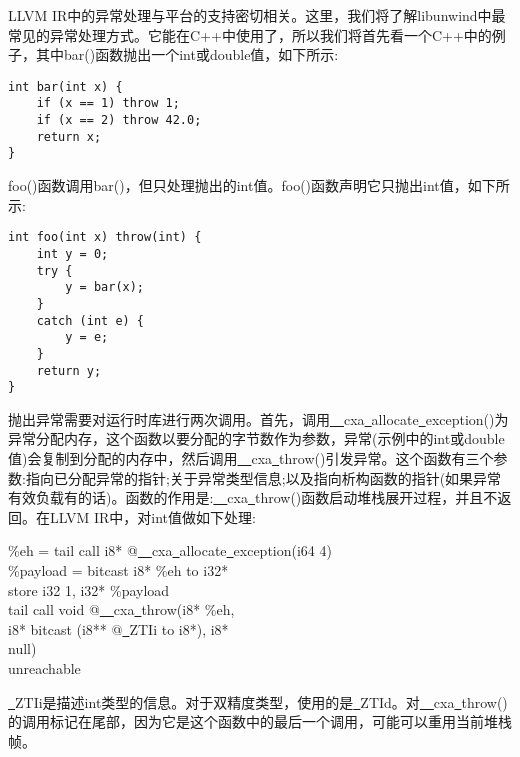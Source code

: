 LLVM IR中的异常处理与平台的支持密切相关。这里，我们将了解libunwind中最常见的异常处理方式。它能在C++中使用了，所以我们将首先看一个C++中的例子，其中bar()函数抛出一个int或double值，如下所示:\par

\begin{lstlisting}[caption={}]
int bar(int x) {
	if (x == 1) throw 1;
	if (x == 2) throw 42.0;
	return x;
}
\end{lstlisting}

foo()函数调用bar()，但只处理抛出的int值。foo()函数声明它只抛出int值，如下所示:\par

\begin{lstlisting}[caption={}]
int foo(int x) throw(int) {
	int y = 0;
	try {
		y = bar(x);
	}
	catch (int e) {
		y = e;
	}
	return y;
}
\end{lstlisting}

抛出异常需要对运行时库进行两次调用。首先，调用\underline{~~}cxa\underline{~}allocate\underline{~}exception()为异常分配内存，这个函数以要分配的字节数作为参数，异常(示例中的int或double值)会复制到分配的内存中，然后调用\underline{~~}cxa\underline{~}throw()引发异常。这个函数有三个参数:指向已分配异常的指针;关于异常类型信息;以及指向析构函数的指针(如果异常有效负载有的话)。函数的作用是:\underline{~~}cxa\underline{~}throw()函数启动堆栈展开过程，并且不返回。在LLVM IR中，对int值做如下处理:\par

\begin{tcolorbox}[colback=white,colframe=black]
\%eh = tail call i8* @\underline{~~}cxa\underline{~}allocate\underline{~}exception(i64 4) \\
\%payload = bitcast i8* \%eh to i32* \\
store i32 1, i32* \%payload \\
tail call void @\underline{~~}cxa\underline{~}throw(i8* \%eh, \\
\hspace*{3cm}i8* bitcast (i8** @\underline{~}ZTIi to i8*), i8* \\
\hspace*{3cm}null) \\
unreachable
\end{tcolorbox}

\underline{~}ZTIi是描述int类型的信息。对于双精度类型，使用的是\underline{~}ZTId。对\underline{~~}cxa\underline{~}throw()的调用标记在尾部，因为它是这个函数中的最后一个调用，可能可以重用当前堆栈帧。\par

